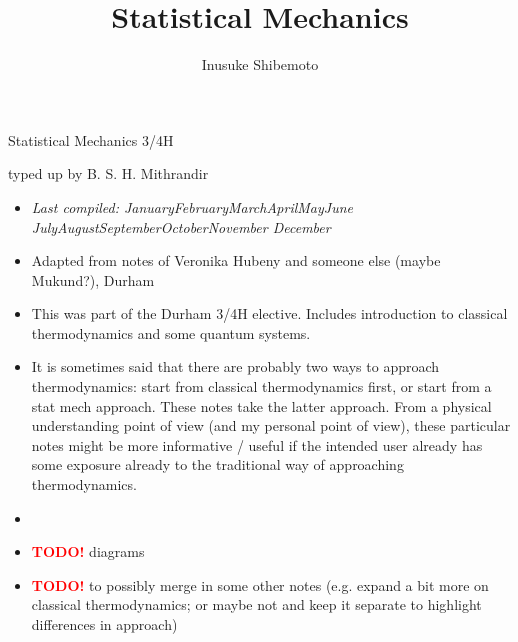\documentclass[letter-paper]{tufte-book}
\title{Statistical Mechanics}
\author[]{Inusuke Shibemoto}
\newcommand{\monthyear}{%
  \ifcase\month\or January\or February\or March\or April\or May\or June\or
  July\or August\or September\or October\or November\or
  December\fi\space\number\year
}
\newcommand{\TODO}{\textcolor{red}{\bf TODO!}\xspace}
\begin{document}



\chapter*{}

\begin{fullwidth}

\par \begin{center}{\Huge Statistical Mechanics 3/4H}\end{center}

\vspace*{5mm}

\par \begin{center}{\Large typed up by B. S. H. Mithrandir}\end{center}

\vspace*{5mm}

\begin{itemize}
  \item \textit{Last compiled: \monthyear}
  \item Adapted from notes of Veronika Hubeny and someone else (maybe Mukund?), Durham
  \item This was part of the Durham 3/4H elective. Includes introduction to
  classical thermodynamics and some quantum systems.
  \item It is sometimes said that there are probably two ways to approach
  thermodynamics: start from classical thermodynamics first, or start from a
  stat mech approach. These notes take the latter approach. From a physical
  understanding point of view (and my personal point of view), these particular
  notes might be more informative / useful if the intended user already has some
  exposure already to the traditional way of approaching thermodynamics.
  \item[]
  \item \TODO diagrams
  \item \TODO to possibly merge in some other notes (e.g. expand a bit more on
  classical thermodynamics; or maybe not and keep it separate to highlight
  differences in approach)
\end{itemize}


\end{fullwidth}
\end{document}
